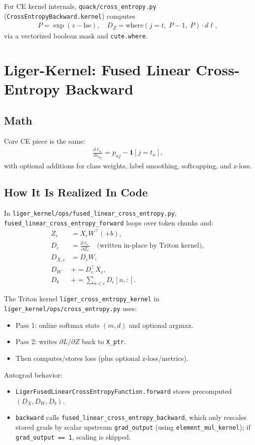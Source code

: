 \documentclass[11pt]{article}
\begin{document}
For CE kernel internals, \texttt{quack/cross\_entropy.py}
(\texttt{CrossEntropyBackward.kernel}) computes
\begin{align}
P = \exp(z-\mathrm{lse}),\quad
D_Z = \mathrm{where}(j=t,\;P-1,\;P)\cdot d\ell,
\end{align}
via a vectorized boolean mask and \texttt{cute.where}.

\section{Liger-Kernel: Fused Linear Cross-Entropy Backward}
\subsection{Math}
Core CE piece is the same:
\begin{align}
\frac{\partial \ell_n}{\partial z_{nj}} = p_{nj} - \mathbf{1}[j=t_n],
\end{align}
with optional additions for class weights, label smoothing, softcapping, and
z-loss.

\subsection{How It Is Realized In Code}
In \texttt{liger\_kernel/ops/fused\_linear\_cross\_entropy.py},
\texttt{fused\_linear\_cross\_entropy\_forward} loops over token chunks and:
\begin{align}
Z_c &= X_c W^\top (+b), \\
D_c &= \frac{\partial \ell_c}{\partial Z_c}
\quad\text{(written in-place by Triton kernel)}, \\
D_{X,c} &= D_c W, \\
D_W &\mathrel{+}= D_c^\top X_c, \\
D_b &\mathrel{+}= \sum_{n\in c} D_c[n,:].
\end{align}

The Triton kernel \texttt{liger\_cross\_entropy\_kernel} in
\texttt{liger\_kernel/ops/cross\_entropy.py} uses:
\begin{itemize}
\item Pass 1: online softmax stats $(m,d)$ and optional argmax.
\item Pass 2: writes $\partial L/\partial Z$ back to \texttt{X\_ptr}.
\item Then computes/stores loss (plus optional z-loss/metrics).
\end{itemize}

Autograd behavior:
\begin{itemize}
\item \texttt{LigerFusedLinearCrossEntropyFunction.forward} stores
precomputed $(D_X,D_W,D_b)$.
\item \texttt{backward} calls
\texttt{fused\_linear\_cross\_entropy\_backward}, which only rescales stored
grads by scalar upstream \texttt{grad\_output} (using
\texttt{element\_mul\_kernel}); if \texttt{grad\_output == 1}, scaling is skipped.
\end{itemize}
\end{document}
